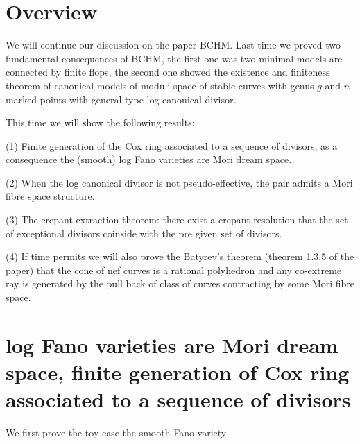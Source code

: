 \documentclass[11pt]{article}
\theoremstyle{definition}
\begin{document}
	\section{Overview}
	We will continue our discussion on the paper BCHM. Last time we proved two fundamental consequences of BCHM, the first one was two minimal models are connected by finite flops, the second one showed the existence and finiteness theorem of canonical models of moduli space of stable curves with genus $g$ and $n$ marked points with general type log canonical divisor.
	
	This time we will show the following results:
	
	(1) Finite generation of the Cox ring associated to a sequence of divisors, as a consequence the (smooth) log Fano varieties are Mori dream space.
	
	(2) When the log canonical divisor is not pseudo-effective, the pair admits a Mori fibre space structure.
	
	(3) The crepant extraction theorem: there exist a crepant resolution that the set of exceptional divisors coinside with the pre given set of divisors.
	
	(4) If time permits we will also prove the Batyrev’s theorem (theorem 1.3.5 of the paper) that the cone of nef curves is a rational polyhedron and any co-extreme ray is generated by the pull back of class of curves contracting by some Mori fibre space.
	
	\section{log Fano varieties are Mori dream space, finite generation of Cox ring associated to a sequence of divisors}
	
	We first prove the toy case the smooth Fano variety 
	\section{}
	\printbibliography
\end{document}
